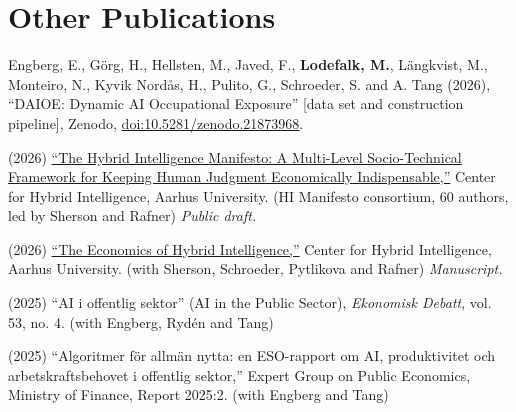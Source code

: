 \documentclass[11pt,a4paper]{article}
\newcommand{\name}[1]{\textbf{#1}}
\newcommand{\publication}[1]{\item #1}
\begin{document}
\section{Other Publications}

\begin{enumerate}[label={[\arabic*]}]

\publication{Engberg, E., Görg, H., Hellsten, M., Javed, F., \name{Lodefalk, M.}, Längkvist, M., Monteiro, N., Kyvik Nordås, H., Pulito, G., Schroeder, S. and A. Tang (2026), ``DAIOE: Dynamic AI Occupational Exposure'' [data set and construction pipeline], Zenodo, \href{https://doi.org/10.5281/zenodo.21873968}{doi:10.5281/zenodo.21873968}.} %

\publication{(2026) \href{https://hi-infinity.ai/research/the-hybrid-intelligence-manifesto/}{``The Hybrid Intelligence Manifesto: A Multi-Level Socio-Technical Framework for Keeping Human Judgment Economically Indispensable,''} Center for Hybrid Intelligence, Aarhus University. (HI Manifesto consortium, 60 authors, led by Sherson and Rafner) \textit{Public draft.}} %

\publication{(2026) \href{https://hi-infinity.ai/research/the-economics-of-hybrid-intelligence/}{``The Economics of Hybrid Intelligence,''} Center for Hybrid Intelligence, Aarhus University. (with Sherson, Schroeder, Pytlikova and Rafner) \textit{Manuscript.}} %

\publication{(2025) ``AI i offentlig sektor'' (AI in the Public Sector), \textit{Ekonomisk Debatt}, vol. 53, no. 4. (with Engberg, Rydén and Tang)}

\publication{(2025) ``Algoritmer för allmän nytta: en ESO-rapport om AI, produktivitet och arbetskraftsbehovet i offentlig sektor,'' Expert Group on Public Economics, Ministry of Finance, Report 2025:2. (with Engberg and Tang)}


\end{enumerate}
\end{document}
